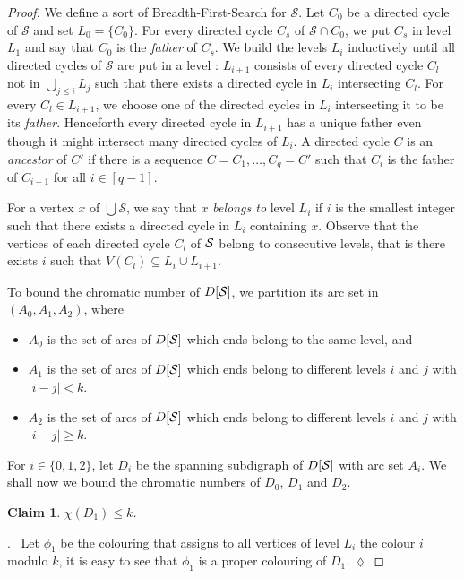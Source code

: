 \documentclass[utf8,10pt]{article}
\theoremstyle{plain}
\newtheorem{claim}{Claim}[theorem]
\theoremstyle{definition}
\theoremstyle{remark}
\newenvironment{subproof}{\par\noindent {\it Subproof}.\ }{\hfill$\lozenge$\par\vspace{11pt}}
\begin{document}
\begin{proof}
We define a sort of Breadth-First-Search for $\mathcal{S}$.
Let $C_0$ be a directed cycle of $\mathcal{S}$ and set $L_0 = \{C_0\}$. For every directed cycle $C_s$ of $\mathcal{S}\cap C_0$, we put $C_s$ in level $L_1$ and say that $C_0$ is the \textit{father} of $C_s$. We build  the levels $L_i$ inductively
until all directed cycles of $\mathcal{S}$ are put in a level : $L_{i+1}$ consists of every directed cycle $C_l$ not in $\bigcup_{j \leq i} L_j$ such that 
there exists a directed cycle in $L_i$ intersecting $C_l$.  For every $C_l\in L_{i+1}$, we choose one of the directed cycles in $L_{i}$ intersecting it to be its {\it  father}. Henceforth every directed cycle in $L_{i+1}$ has a unique  father even though it might intersect many directed cycles of $L_i$.
A directed cycle $C$ is an {\it ancestor} of $C'$ if there is a sequence $C=C_1, \dots , C_q=C'$ such that $C_i$ is the father of $C_{i+1}$ for all $i\in [q-1]$.

For a vertex $x$ of $\bigcup \mathcal{S}$, we say that $x$ \textit{belongs to} level $L_i$ if
$i$ is the smallest integer such that there exists a directed cycle in $L_i$ containing $x$. Observe that the vertices of each directed cycle $C_l$ of ${\cal S}$ belong to consecutive levels, that is there exists $i$ such that $V(C_l)\subseteq L_i\cup L_{i+1}$.




To bound  the chromatic number of $D[{\cal S}]$, we partition its arc set in $(A_0,A_1, A_2)$, where
\begin{itemize}
	\item $A_0$ is the set of arcs of $D[{\cal S}]$ which ends belong to the same level, and
	\item $A_1$ is the set of arcs of $D[{\cal S}]$ which ends belong to different levels $i$ and $j$ with $ | i - j| < k$.	
	\item $A_2$ is the set of arcs of $D[{\cal S}]$ which ends belong to different levels $i$ and $j$ with $ | i - j| \geq k$.
\end{itemize} 

For $i\in \{0,1,2\}$, let $D_i$ be the spanning subdigraph of $D[{\cal S}]$ with arc set $A_i$.
We shall now we bound the chromatic numbers of $D_0$, $D_1$ and  $D_2$.


\begin{claim}\label{claim:D1}
$\chi(D_1)\leq k$.
\end{claim}

\begin{subproof}
Let $\phi_1$ be the colouring that assigns to all vertices of level $L_i$ the colour $i$ modulo $k$, it 
is easy to see that $\phi_1$ is a proper colouring of $D_1$.
\end{subproof}







\end{proof}
\end{document}
